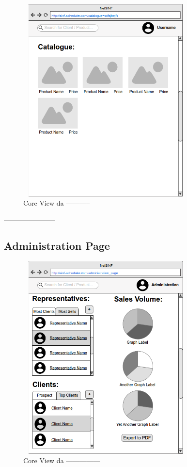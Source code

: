 \begin{titlepage}
\begin{figure}[H]
  \centering
    \includegraphics[width=9cm, height = 10.5cm]{SINF_cataloguepage.png}
  \caption{Core View da -----------}
  \label{uml}
\end{figure}

-----------------------

\subsection{Administration Page}

\begin{figure}[H]
  \centering
    \includegraphics[width=9cm, height = 10.5cm]{SINF_administrationpage.png}
  \caption{Core View da ---------------}
  \label{uml}
\end{figure}


\end{titlepage}

